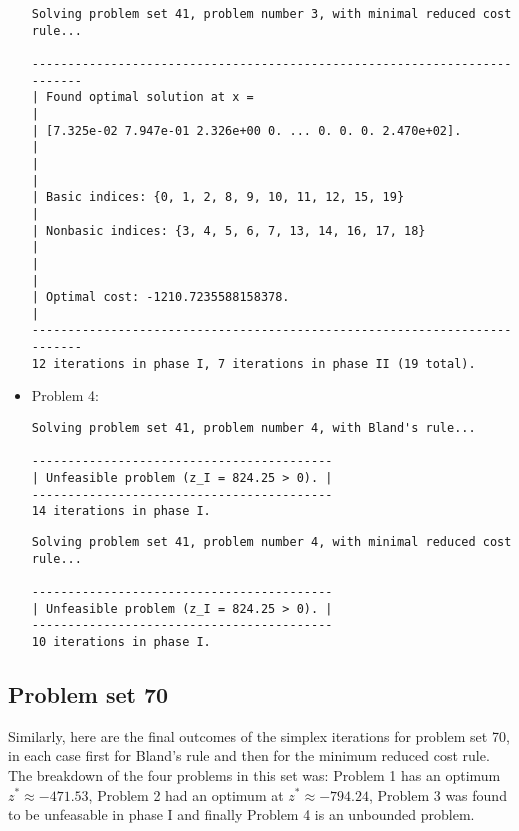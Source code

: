 \documentclass[a4paper]{article}
\begin{document}
\begin{itemize}
\newpage
\begin{verbatim}
Solving problem set 41, problem number 3, with minimal reduced cost rule...

--------------------------------------------------------------------------
| Found optimal solution at x =                                          |
| [7.325e-02 7.947e-01 2.326e+00 0. ... 0. 0. 0. 2.470e+02].             |
|                                                                        |
| Basic indices: {0, 1, 2, 8, 9, 10, 11, 12, 15, 19}                     |
| Nonbasic indices: {3, 4, 5, 6, 7, 13, 14, 16, 17, 18}                  |
|                                                                        |
| Optimal cost: -1210.7235588158378.                                     |
--------------------------------------------------------------------------
12 iterations in phase I, 7 iterations in phase II (19 total).
\end{verbatim}

\vspace{2ex}
\item Problem 4:
\begin{verbatim}
Solving problem set 41, problem number 4, with Bland's rule...

------------------------------------------
| Unfeasible problem (z_I = 824.25 > 0). |
------------------------------------------
14 iterations in phase I.
\end{verbatim}

\vspace{2ex}
\begin{verbatim}
Solving problem set 41, problem number 4, with minimal reduced cost rule...

------------------------------------------
| Unfeasible problem (z_I = 824.25 > 0). |
------------------------------------------
10 iterations in phase I.
\end{verbatim}

\vspace{2ex}
\end{itemize}

\subsection{Problem set 70}

Similarly, here are the final outcomes of the simplex iterations for problem set 70, in each case first for Bland's rule and then for the minimum reduced cost rule. The breakdown of the four problems in this set was: Problem 1 has an optimum ${z}^{*} \approx -471.53$, Problem 2 had an optimum at ${z}^{*} \approx -794.24$, Problem 3 was found to be unfeasable in phase I and finally Problem 4 is an unbounded problem.
\end{document}
